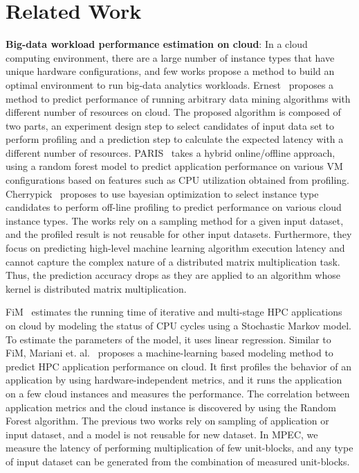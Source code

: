 \documentclass[10pt, conference, compsocconf]{IEEEtran}
\begin{document}
\section{Related Work}\label{sec:relatedwork}
\textbf{Big-data workload performance estimation on cloud}: In a cloud computing environment, there are a large number of instance types that have unique hardware configurations, and few works propose a method to build an optimal environment to run big-data analytics workloads. Ernest~\cite{ernest} proposes a method to predict performance of running arbitrary data mining algorithms with different number of resources on cloud. The proposed algorithm is composed of two parts, an experiment design step to select candidates of input data set to perform profiling and a prediction step to calculate the expected latency with a different number of resources. PARIS~\cite{paris} takes a hybrid online/offline approach, using a random forest model to predict application performance on various VM configurations based on features such as CPU utilization obtained from profiling. Cherrypick~\cite{cherrypick} proposes to use bayesian optimization to select instance type candidates to perform off-line profiling to predict performance on various cloud instance types. The works rely on a sampling method for a given input dataset, and the profiled result is not reusable for other input datasets. Furthermore, they focus on predicting high-level machine learning algorithm execution latency and cannot capture the complex nature of a distributed matrix multiplication task. Thus, the prediction accuracy drops as they are applied to an algorithm whose kernel is distributed matrix multiplication.

FiM~\cite{fim} estimates the running time of iterative and multi-stage HPC applications on cloud by modeling the status of CPU cycles using a Stochastic Markov model. To estimate the parameters of the model, it uses linear regression. Similar to FiM, Mariani et. al.~\cite{hpc-cloud-predict} proposes a machine-learning based modeling method to predict HPC application performance on cloud. It first profiles the behavior of an application by using hardware-independent metrics, and it runs the application on a few cloud instances and measures the performance. The correlation between application metrics and the cloud instance is discovered by using the Random Forest algorithm. The previous two works rely on sampling of application or input dataset, and a model is not reusable for new dataset. In MPEC, we measure the latency of performing multiplication of few unit-blocks, and any type of input dataset can be generated from the combination of measured unit-blocks.
\end{document}
